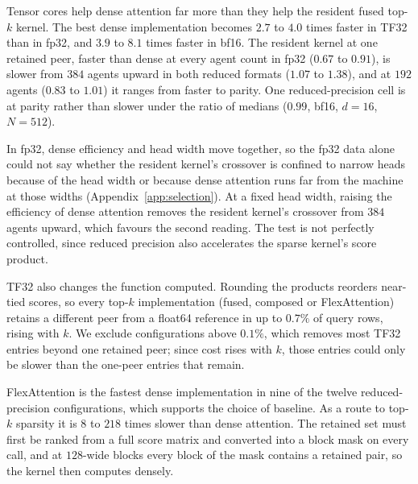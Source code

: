 \begin{table}[t]
\centering\small
\caption{The fused crossover in three numerical formats. Each hand-written
kernel is searched separately in each format; the best dense implementation is
the fastest of the vendor library, FlexAttention (\emph{flex}) and our tuned
kernel (\emph{ours}). Ratios are of minima, with the ratio of medians at one retained peer beside it. A dash marks a configuration in which TF32 rounding
changed the retained peer in more than $0.1\%$ of query rows. The last column is
top-$k$ through FlexAttention with a block mask built from the retained set,
including the per-call mask construction.}
\label{tab:precision}

\end{table}

Tensor cores help dense attention far more than they help the resident fused
top-$k$ kernel. The best dense implementation becomes $2.7$ to $4.0$ times faster in
TF32 than in fp32, and $3.9$ to $8.1$ times faster in bf16. The resident kernel at
one retained peer, faster than dense at every agent count in fp32 ($0.67$ to
$0.91$), is slower from $384$ agents upward in both reduced formats ($1.07$ to
$1.38$), and at $192$ agents ($0.83$ to $1.01$) it ranges from faster to parity.
One reduced-precision cell is at parity rather than slower under the ratio of
medians ($0.99$, bf16, $d{=}16$, $N{=}512$).

In fp32, dense efficiency and head width move together, so the fp32 data alone
could not say whether the resident kernel's crossover is confined to narrow
heads because of the head width or because dense attention runs far from the
machine at those widths (Appendix~\ref{app:selection}). At a fixed head width,
raising the efficiency of dense attention removes the resident kernel's
crossover from $384$ agents upward, which favours
the second reading. The test is not perfectly controlled, since reduced
precision also accelerates the sparse kernel's score product.

TF32 also changes the function computed. Rounding the products reorders
near-tied scores, so every top-$k$ implementation (fused, composed or
FlexAttention) retains a different peer from a float64 reference in up to
$0.7\%$ of query rows, rising with $k$. We exclude configurations above $0.1\%$,
which removes most TF32 entries beyond one retained peer; since cost rises with
$k$, those entries could only be slower than the one-peer entries that remain.

FlexAttention is the fastest dense implementation in nine of the twelve
reduced-precision configurations, which supports the choice of baseline. As a
route to top-$k$ sparsity it is $8$ to $218$ times slower than dense attention.
The retained set must first be ranked from a full score matrix and converted
into a block mask on every call, and at $128$-wide blocks every block of the
mask contains a retained pair, so the kernel then computes densely.

